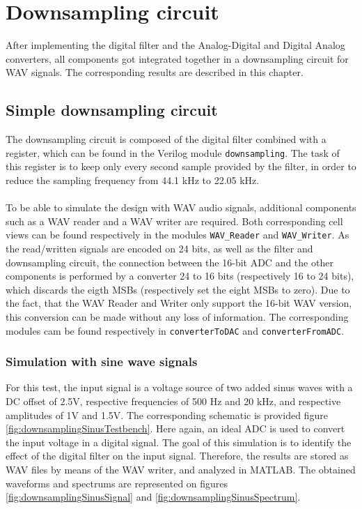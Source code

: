 \chapter{Downsampling circuit}

After implementing the digital filter and the Analog-Digital and Digital Analog converters, all components got integrated together in a downsampling circuit for WAV signals. The corresponding results are described in this chapter.

\section{Simple downsampling circuit}

The downsampling circuit is composed of the digital filter combined with a register, which can be found in the Verilog module \texttt{downsampling}. The task of this register is to keep only every second sample provided by the filter, in order to reduce the sampling frequency from 44.1 kHz to 22.05 kHz.\\
\\
To be able to simulate the design with WAV audio signals, additional components such as a WAV reader and a WAV writer are required. Both corresponding cell views can be found respectively in the modules \texttt{WAV\_Reader} and \texttt{WAV\_Writer}. As the read/written signals are encoded on 24 bits, as well as the filter and downsampling circuit, the connection between the 16-bit ADC and the other components is performed by a converter 24 to 16 bits (respectively 16 to 24 bits), which discards the eigth MSBs (respectively set the eight MSBs to zero). Due to the fact, that the WAV Reader and Writer only support the 16-bit WAV version, this conversion can be made without any loss of information. The corresponding modules cam be found respectively in \texttt{converterToDAC} and \texttt{converterFromADC}. 

\subsection{Simulation with sine wave signals}

For this test, the input signal is a voltage source of two added sinus waves with a DC offset of 2.5V, respective frequencies of 500 Hz and 20 kHz, and respective amplitudes of 1V and 1.5V. The corresponding schematic is provided figure \ref{fig:downsamplingSinusTestbench}. Here again, an ideal ADC is used to convert the input voltage in a digital signal. The goal of this simulation is to identify the effect of the digital filter on the input signal. Therefore, the results are stored as WAV files by means of the WAV writer, and analyzed in MATLAB. The obtained waveforms and spectrums are represented on figures \ref{fig:downsamplingSinusSignal} and \ref{fig:downsamplingSinusSpectrum}.\\
\\

